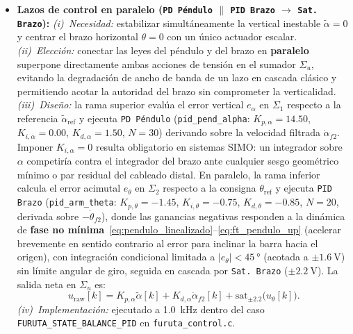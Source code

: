 \begin{itemize}
    \item \textbf{Lazos de control en paralelo (\texttt{PD Péndulo} $\parallel$ \texttt{PID Brazo} $\to$ \texttt{Sat. Brazo}):}
    \textit{(i)~Necesidad:} estabilizar simultáneamente la vertical inestable $\tilde{\alpha}=0$ y centrar el brazo horizontal $\theta=0$ con un único actuador escalar.
    \textit{(ii)~Elección:} conectar las leyes del péndulo y del brazo en \textbf{paralelo} superpone directamente ambas acciones de tensión en el sumador $\Sigma_u$, evitando la degradación de ancho de banda de un lazo en cascada clásico y permitiendo acotar la autoridad del brazo sin comprometer la verticalidad.
    \textit{(iii)~Diseño:} la rama superior evalúa el error vertical $e_\alpha$ en $\Sigma_1$ respecto a la referencia $\tilde{\alpha}_{\text{ref}}$ y ejecuta \texttt{PD Péndulo} (\texttt{pid\_pend\_alpha}: $K_{p,\alpha}=14.50$, $K_{i,\alpha}=0.00$, $K_{d,\alpha}=1.50$, $N=30$) derivando sobre la velocidad filtrada $\dot{\alpha}_{f2}$. Imponer $K_{i,\alpha}=0$ resulta obligatorio en sistemas SIMO: un integrador sobre $\alpha$ competiría contra el integrador del brazo ante cualquier sesgo geométrico mínimo o par residual del cableado distal. En paralelo, la rama inferior calcula el error acimutal $e_\theta$ en $\Sigma_2$ respecto a la consigna $\theta_{\text{ref}}$ y ejecuta \texttt{PID Brazo} (\texttt{pid\_arm\_theta}: $K_{p,\theta}=-1.45$, $K_{i,\theta}=-0.75$, $K_{d,\theta}=-0.85$, $N=20$, derivada sobre $-\dot{\theta}_{f2}$), donde las ganancias negativas responden a la dinámica de \textbf{fase no mínima}~\eqref{eq:pendulo_linealizado}--\eqref{eq:ft_pendulo_up} (acelerar brevemente en sentido contrario al error para inclinar la barra hacia el origen), con integración condicional limitada a $|e_\theta|<\qty{45}{\degree}$ (acotada a $\pm\qty{1.6}{\volt}$) sin límite angular de giro, seguida en cascada por \texttt{Sat. Brazo} ($\pm\qty{2.2}{\volt}$). La salida neta en $\Sigma_u$ es:
    \begin{equation}
        u_{\text{raw}}[k] = K_{p,\alpha}\tilde{\alpha}[k] + K_{d,\alpha}\dot{\alpha}_{f2}[k] + \mathrm{sat}_{\pm 2.2}\!\bigl(u_{\theta}[k]\bigr).
        \label{eq:m4_dual}
    \end{equation}
    \textit{(iv)~Implementación:} ejecutado a \qty{1.0}{\kilo\hertz} dentro del caso \texttt{FURUTA\_\allowbreak STATE\_\allowbreak BALANCE\_\allowbreak PID} en \texttt{furuta\_control.c}.


\end{itemize}
